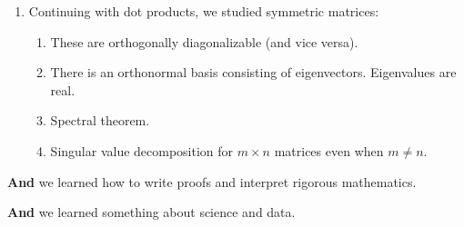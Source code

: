 \documentclass[12pt,letterpaper]{article}
\begin{document}
\begin{enumerate}
\begin{enumerate}
            \item Gram-Schmidt algorithm.
            \item Least squares and finding the closest vector in a subspace.
        \end{enumerate}
        \item Continuing with dot products, we studied symmetric matrices:
        \begin{enumerate}
            \item These are orthogonally diagonalizable (and vice versa).
            \item There is an orthonormal basis consisting of eigenvectors. Eigenvalues are real.
            \item Spectral theorem.
            \item Singular value decomposition for $m \times n$ matrices even when $m \neq n$.
        \end{enumerate}
    \end{enumerate}


     \textbf{And} we learned how to write proofs and interpret rigorous mathematics.
    
     \textbf{And} we learned something about science and data.
\end{document}
